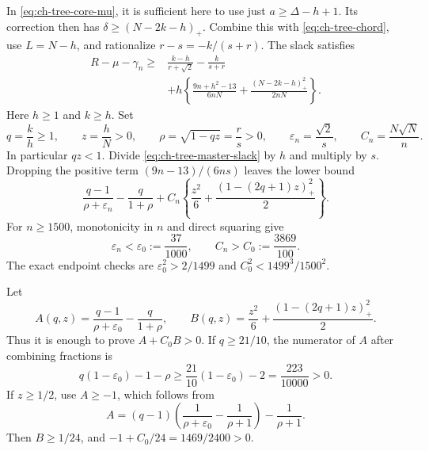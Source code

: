 \documentclass[11pt,a4paper]{article}
\theoremstyle{remark}
\numberwithin{equation}{section}
\begin{document}
In \eqref{eq:ch-tree-core-mu}, it is sufficient here to use just
$a\ge\Delta-h+1$. Its correction then has
$\delta\ge(N-2k-h)_+$. Combine this with
\eqref{eq:ch-tree-chord}, use $L=N-h$, and rationalize
$r-s=-k/(s+r)$. The slack satisfies
\begin{equation}\label{eq:ch-tree-master-slack}
\begin{split}
 R-\mu-\gamma_n\ge{}&
 \frac{k-h}{r+\sqrt2}-\frac{k}{s+r}\\
 &+h\left\{\frac{9n+h^2-13}{6nN}
                    +\frac{(N-2k-h)_+^2}{2nN}\right\}.
\end{split}
\end{equation}
Here $h\ge1$ and $k\ge h$. Set
\[
 q=\frac kh\ge1,\qquad z=\frac hN>0,\qquad
 \rho=\sqrt{1-qz}=\frac rs>0,
 \qquad \varepsilon_n=\frac{\sqrt2}s,\qquad C_n=\frac{N\sqrt N}{n}.
\]
In particular $qz<1$. Divide \eqref{eq:ch-tree-master-slack} by $h$
and multiply by $s$. Dropping the positive term
$(9n-13)/(6ns)$ leaves the lower bound
\begin{equation}\label{eq:ch-tree-normalized}
 \frac{q-1}{\rho+\varepsilon_n}-\frac q{1+\rho}
 +C_n\left\{\frac{z^2}{6}
                  +\frac{(1-(2q+1)z)_+^2}{2}\right\}.
\end{equation}
For $n\ge1500$, monotonicity in $n$ and direct squaring give
\[
 \varepsilon_n<\varepsilon_0:=\frac{37}{1000},
 \qquad C_n>C_0:=\frac{3869}{100}.
\]
The exact endpoint checks are
$\varepsilon_0^2>2/1499$ and
$C_0^2<1499^3/1500^2$.

Let
\[
 A(q,z)=\frac{q-1}{\rho+\varepsilon_0}-\frac q{1+\rho},
 \qquad B(q,z)=\frac{z^2}{6}
                          +\frac{(1-(2q+1)z)_+^2}{2}.
\]
Thus it is enough to prove $A+C_0B>0$.
If $q\ge21/10$, the numerator of $A$ after combining fractions is
\[
 q(1-\varepsilon_0)-1-\rho
 \ge\frac{21}{10}(1-\varepsilon_0)-2
 =\frac{223}{10000}>0.
\]
If $z\ge1/2$, use $A\ge-1$, which follows from
\[
 A=(q-1)\left(\frac1{\rho+\varepsilon_0}
                         -\frac1{\rho+1}\right)-\frac1{\rho+1}.
\]
Then $B\ge1/24$, and
$-1+C_0/24=1469/2400>0$.
\end{document}
